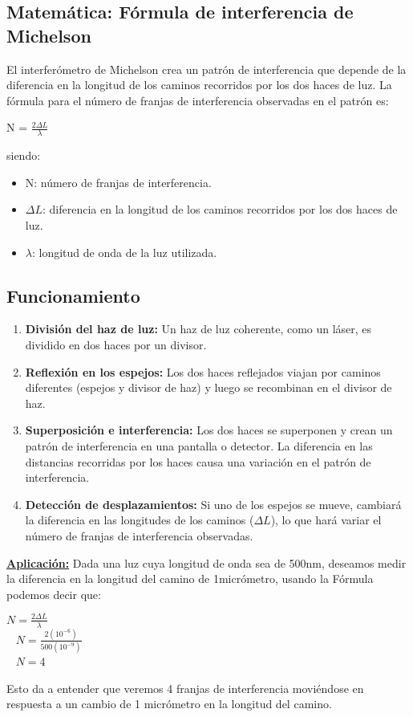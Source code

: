 \documentclass[a4paper, 12pt]{article}
\begin{document}
	\subsection{Matemática: Fórmula de interferencia de Michelson}
	
	El interferómetro de Michelson crea un patrón de interferencia que depende de la diferencia en la longitud de los caminos recorridos por los dos haces de luz. La fórmula para el número de franjas de interferencia observadas en el patrón es:
	
		\begin{center}
			N = $\frac{2 \Delta L}{\lambda}$ \\
		\end{center}
		
	siendo:
		\begin{itemize}
			\item N: número de franjas de interferencia.
			\item $\Delta L$: diferencia en la longitud de los caminos recorridos por los dos haces de luz.
			\item $\lambda$: longitud de onda de la luz utilizada.
		\end{itemize}
		
	\subsection{Funcionamiento}
		\begin{enumerate}
			\item \textbf{División del haz de luz:} Un haz de luz coherente, como un láser, es dividido en dos haces por un divisor.
			\item \textbf{Reflexión en los espejos:} Los dos haces reflejados viajan por caminos diferentes (espejos y divisor de haz) y luego se recombinan en el divisor de haz.
			\item \textbf{Superposición e interferencia:} Los dos haces se superponen y crean un patrón de interferencia en una pantalla o detector. La diferencia en las distancias recorridas por los haces causa una variación en el patrón de interferencia.
			\item \textbf{Detección de desplazamientos:} Si uno de los espejos se mueve, cambiará la diferencia en las longitudes de los caminos ($\Delta L$), lo que hará variar el número de franjas de interferencia observadas. 
		\end{enumerate}
		
		\textbf{\underline{Aplicación:}} \newline
		\indent Dada una luz cuya longitud de onda sea de 500nm, deseamos medir la diferencia en la longitud del camino de 1micrómetro, usando la Fórmula podemos decir que:
		\begin{center}
			$N = \frac{2 \Delta L}{\lambda}$  \\ \
			\newline
			$N = \frac{2(10^{-6})}{500(10^{-9})}$  \\ \
			\newline
			$N = 4$ \\
		\end{center}
		Esto da a entender que veremos 4 franjas de interferencia moviéndose en respuesta a un cambio de 1 micrómetro en la longitud del camino.
\end{document}
